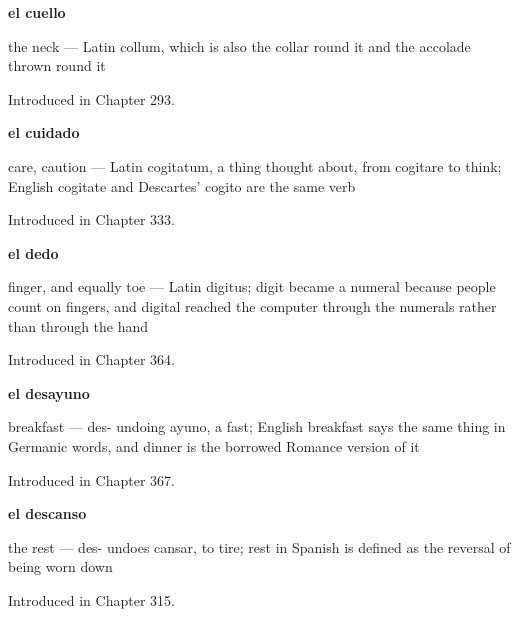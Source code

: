 \noindent\begin{minipage}[t]{\linewidth}
\raggedright
\textbf{el cuello}\par
\small the neck — Latin collum, which is also the collar round it and the accolade thrown round it\par
\footnotesize Introduced in Chapter 293.
\end{minipage}\par\medskip

\noindent\begin{minipage}[t]{\linewidth}
\raggedright
\textbf{el cuidado}\par
\small care, caution — Latin cogitatum, a thing thought about, from cogitare to think; English cogitate and Descartes' cogito are the same verb\par
\footnotesize Introduced in Chapter 333.
\end{minipage}\par\medskip

\noindent\begin{minipage}[t]{\linewidth}
\raggedright
\textbf{el dedo}\par
\small finger, and equally toe — Latin digitus; digit became a numeral because people count on fingers, and digital reached the computer through the numerals rather than through the hand\par
\footnotesize Introduced in Chapter 364.
\end{minipage}\par\medskip

\noindent\begin{minipage}[t]{\linewidth}
\raggedright
\textbf{el desayuno}\par
\small breakfast — des- undoing ayuno, a fast; English breakfast says the same thing in Germanic words, and dinner is the borrowed Romance version of it\par
\footnotesize Introduced in Chapter 367.
\end{minipage}\par\medskip

\noindent\begin{minipage}[t]{\linewidth}
\raggedright
\textbf{el descanso}\par
\small the rest — des- undoes cansar, to tire; rest in Spanish is defined as the reversal of being worn down\par
\footnotesize Introduced in Chapter 315.
\end{minipage}\par\medskip

